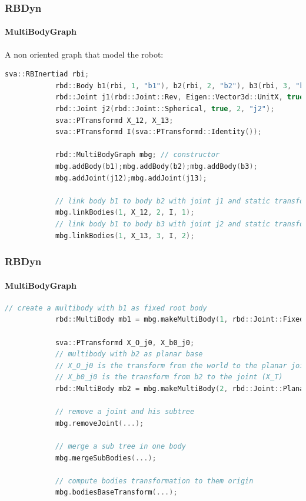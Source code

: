 \documentclass{beamer}
\begin{document}
  	\begin{frame}[fragile]
		\frametitle{RBDyn}
		\framesubtitle{MultiBodyGraph}
		A non oriented graph that model the robot:
		\begin{lstlisting}[language=C++]
			sva::RBInertiad rbi;
			rbd::Body b1(rbi, 1, "b1"), b2(rbi, 2, "b2"), b3(rbi, 3, "b3");
			rbd::Joint j1(rbd::Joint::Rev, Eigen::Vector3d::UnitX, true, 1, "j1");
			rbd::Joint j2(rbd::Joint::Spherical, true, 2, "j2");
			sva::PTransformd X_12, X_13;
			sva::PTransformd I(sva::PTransformd::Identity());

			rbd::MultiBodyGraph mbg; // constructor
			mbg.addBody(b1);mbg.addBody(b2);mbg.addBody(b3);
			mbg.addJoint(j12);mbg.addJoint(j13);

			// link body b1 to body b2 with joint j1 and static transform X_12
			mbg.linkBodies(1, X_12, 2, I, 1);
			// link body b1 to body b3 with joint j2 and static transform X_13
			mbg.linkBodies(1, X_13, 3, I, 2);
		\end{lstlisting}
	\end{frame}
  	\begin{frame}[fragile]
		\frametitle{RBDyn}
		\framesubtitle{MultiBodyGraph}
		\begin{lstlisting}[language=C++]
			// create a multibody with b1 as fixed root body
			rbd::MultiBody mb1 = mbg.makeMultiBody(1, rbd::Joint::Fixed);

			sva::PTransformd X_O_j0, X_b0_j0;
			// multibody with b2 as planar base 
			// X_O_j0 is the transform from the world to the planar joint
			// X_b0_j0 is the transform from b2 to the joint (X_T)
			rbd::MultiBody mb2 = mbg.makeMultiBody(2, rbd::Joint::Planar, X_O_j0, X_b0_j0);

			// remove a joint and his subtree
			mbg.removeJoint(...);

			// merge a sub tree in one body
			mbg.mergeSubBodies(...);

			// compute bodies transformation to them origin
			mbg.bodiesBaseTransform(...);
		\end{lstlisting}
	\end{frame}
\end{document}

